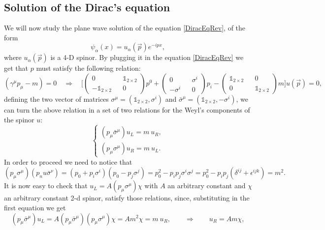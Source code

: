 \subsection{Solution of the Dirac's equation}
We will now study the plane wave solution of the equation \eqref{DiracEqRev}, of the form 
\begin{equation*}
    \psi_\alpha(x)=u_\alpha(\vec p)e^{-ipx},
\end{equation*}
where $u_\alpha(\vec p)$ is a 4-D spinor.
By plugging it in the equation \eqref{DiracEqRev} we get that $p$ must satisfy the following relation:
\begin{equation*}
    (\gamma^\mu p_\mu-m)=0\quad\Rightarrow\quad\bigg[\begin{pmatrix}
        0&&\mathds{1}_{2\times 2}\\-\mathds{1}_{2\times 2}&&0
    \end{pmatrix}p^0+\begin{pmatrix}
        0&&\sigma^i\\-\sigma^i&&0
    \end{pmatrix}p_i-\begin{pmatrix}
        \mathds{1}_{2\times 2}&&0\\0&&\mathds{1}_{2\times 2}
    \end{pmatrix}m\bigg]u(\vec p)=0,
\end{equation*}
defining the two vector of matrices $\sigma^\mu=(\mathds{1}_{2\times2},\sigma^i)$ and $\bar\sigma^\mu=(\mathds{1}_{2\times2},-\sigma^i)$, we can turn the above relation in a set of two relations for the Weyl's components of the spinor $u$:
\begin{equation*}
    \begin{cases}
        (p_\mu\bar\sigma^\mu)u_L=m\ u_R,\\(p_\mu\sigma^\mu)u_R=m\ u_L.
    \end{cases}
\end{equation*}
In order to proceed we need to notice that
\begin{equation*}
    (p_\mu\sigma^\mu)(p_nu\bar\sigma^\nu)=(p_0+p_i\sigma^i)(p_0-p_j\sigma^j)=p_0^2-p_ip_j\sigma^i\sigma^j=p_0^2-p_ip_j(\delta^{ij}+\epsilon^{ijk})=m^2.
\end{equation*}
It is now easy to check that $u_L=A(p_\mu\sigma^\mu)\chi$ with $A$ an arbitrary constant and $\chi$ an arbitrary constant 2-d spinor, satisfy those relations, since, substituting in the first equation we get
\begin{equation*}
    (p_\mu\bar\sigma^\mu)u_L=A(p_\mu\bar\sigma^\mu)(p_\mu\sigma^\mu)\chi=Am^2\chi=m\ u_R,\qquad \Rightarrow\qquad u_R=Am\chi,
\end{equation*}
